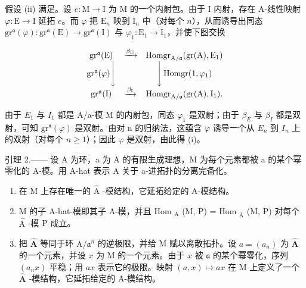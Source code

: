 假设 (ii) 满足。设 \(e: \mathrm{M} \to \mathrm{I}\) 为 M 的一个内射包。由于 I 内射，存在 A-线性映射 \(\varphi: \mathrm{E} \to \mathrm{I}\) 延拓 \(e\)。而 \(\varphi\) 把 \(\mathrm{E}_n\) 映到 \(\mathrm{I}_n\) 中（对每个 \(n\)），从而诱导出同态 \(\mathrm{gr}^{\mathfrak{a}}(\varphi):\mathrm{gr}^{\mathfrak{a}}(\mathrm{E})\to \mathrm{gr}^{\mathfrak{a}}(\mathrm{I})\) 与 \(\varphi_{1}:\mathrm{E}_{1}\rightarrow \mathrm{I}_{1}\)，并使下图交换

\[
\begin{array}{c c c} \operatorname{gr} ^ {\mathfrak {a}} (\mathrm{E}) & \xrightarrow {\beta_ {\mathrm{E}}} & \operatorname{Homgr} _ {\mathrm{A} / \mathfrak {a}} (\operatorname{gr} (\mathrm{A}), \mathrm{E} _ {1}) \\ \operatorname{gr} ^ {\mathfrak {a}} (\varphi) \Bigg \downarrow & & \Bigg \downarrow \operatorname{Homgr} (1, \varphi_ {1}) \\ \operatorname{gr} ^ {\mathfrak {a}} (\mathrm{I}) & \xrightarrow {\beta_ {\mathrm{I}}} & \operatorname{Homgr} _ {\mathrm{A} / \mathfrak {a}} (\operatorname{gr} (\mathrm{A}), \mathrm{I} _ {1}). \end{array}
\]

由于 \(E_{1}\) 与 \(I_{1}\) 都是 A/a-模 M 的内射包，同态 \(\varphi_{1}\) 是双射；由于 \(\beta_{E}\) 与 \(\beta_{I}\) 都是双射，可知 \(\mathrm{gr}^{\mathfrak{a}}(\varphi)\) 是双射。由对 n 的归纳法，这蕴含 \(\varphi\) 诱导一个从 \(E_{n}\) 到 \(I_{n}\) 上的双射（对每个 \(n \geqslant 1\)）；因此 \(\varphi\) 是双射，由此得 (i)。

引理 2.—— 设 A 为环，a 为 A 的有限生成理想，M 为每个元素都被 a 的某个幂零化的 A-模。用 A-hat 表示 A 关于 a-进拓扑的分离完备化。

\begin{enumerate}
\def\labelenumi{\alph{enumi})}
\item
  在 M 上存在唯一的 \(\widehat{\mathrm{A}}\) -模结构，它延拓给定的 A-模结构。
\item
  M 的子 A-hat-模即其子 A-模，并且 Hom \(_{\text{A}}\) (M, P) = Hom \(_{\widehat{\text{A}}}\) (M, P) 对每个 \(\widehat{\text{A}}\) -模 P 成立。
\item
  把 \(\widehat{\mathbf{A}}\) 等同于环 \(\mathrm{A} / \mathfrak{a}^n\) 的逆极限，并给 M 赋以离散拓扑。设 \(a = (a_n)\) 为 \(\widehat{\mathbf{A}}\) 的一个元素，并设 \(x\) 为 M 的一个元素。由于 \(x\) 被 \(\mathfrak{a}\) 的某个幂零化，序列 \((a_n x)\) 平稳；用 \(ax\) 表示它的极限。映射 \((a, x) \mapsto ax\) 在 M 上定义了一个 \(\widehat{\mathbf{A}}\) -模结构，它延拓给定的 A-模结构。
\end{enumerate}

